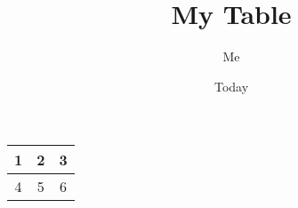 \documentclass{article}
\title{My Table}
\author{Me}
\date{Today}
\begin{document}
\maketitle
\begin{tabular}{|c|c|c|}
\hline
1 & 2 & 3\\
\hline
4 & 5 & 6\\
\hline
\end{tabular}
\end{document}
